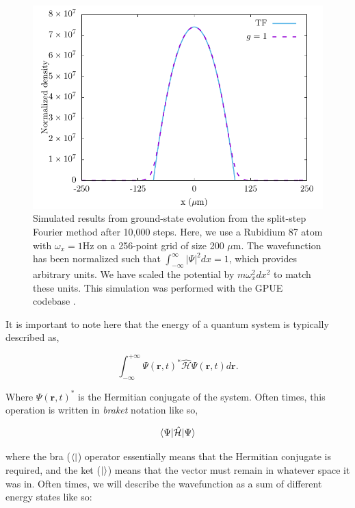 \begin{figure}

\includegraphics[width = \textwidth]{data/qs/SHO/SHO.pdf}

\caption{Simulated results from ground-state evolution from the split-step Fourier method after 10,000 steps. Here, we use a Rubidium 87 atom with $\omega_x = 1$Hz on a 256-point grid of size 200 $\mu$m. The wavefunction has been normalized such that $\int_{-\infty}^\infty|\Psi|^2 dx = 1$, which provides arbitrary units. We have scaled the potential by $m \omega_x^2 dx^2$ to match these units. This simulation was performed with the GPUE codebase \cite{schloss2018}.}
\label{fig:SHO}
\end{figure}

It is important to note here that the energy of a quantum system is typically described as,

\begin{equation}
\int_{-\infty}^{+\infty}\Psi(\mathbf{r},t)^*\mathcal{\hat H}\Psi(\mathbf{r},t)d\mathbf{r}.
\end{equation}

\noindent Where $\Psi(\mathbf{r},t)^*$ is the Hermitian conjugate of the system.
Often times, this operation is written in \textit{braket} notation like so,

\begin{equation}
\braket{\Psi|\mathcal{\hat H}|\Psi}
\end{equation}

\noindent where the bra ($\bra{}$) operator essentially means that the Hermitian conjugate is required, and the ket ($\ket{}$) means that the vector must remain in whatever space it was in.
Often times, we will describe the wavefunction as a sum of different energy states like so:

